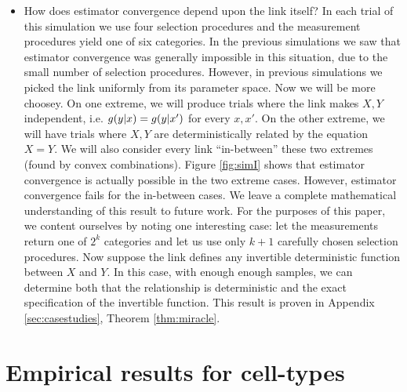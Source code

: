 \begin{itemize}
    \item How does estimator convergence depend upon the link itself?  In each trial of this simulation we use four selection procedures and the measurement procedures yield one of six categories.  In the previous simulations we saw that estimator convergence was generally impossible in this situation, due to the small number of selection procedures.  However, in previous simulations we picked the link uniformly from its parameter space.  Now we will be more choosey.   On one extreme, we will produce trials where the link makes $X,Y$ independent, i.e. $g(y|x)=g(y|x')$ for every $x,x'$.  On the other extreme, we will have trials where $X,Y$ are deterministically related by the equation $X=Y$.  We will also consider every link ``in-between'' these two extremes (found by convex combinations).  Figure \ref{fig:simI} shows that estimator convergence is actually possible in the two extreme cases.  However, estimator convergence fails for the in-between cases.  We leave a complete mathematical understanding of this result to future work.  For the purposes of this paper, we content ourselves by noting one interesting case: let the measurements return one of $2^k$ categories and let us use only $k+1$ carefully chosen selection procedures.  Now suppose the link defines any invertible deterministic function between $X$ and $Y$.  In this case, with enough enough samples, we can determine both that the relationship is deterministic and the exact specification of the invertible function.  This result is proven in Appendix \ref{sec:casestudies}, Theorem \ref{thm:miracle}.
\end{itemize}

                                       

\section{Empirical results for cell-types}

